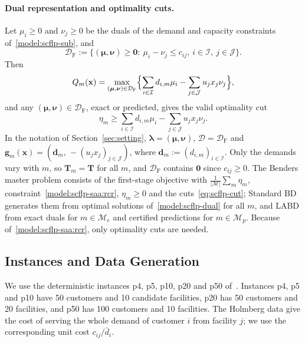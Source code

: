 \paragraph{Dual representation and optimality cuts.} Let $\mu_i\ge0$ and $\nu_j\ge0$ be the duals of the demand and capacity constraints of~\eqref{model:scflp-sub}, and
\[
\mathcal D_{\mathrm F}:=\bigl\{(\boldsymbol\mu,\boldsymbol\nu)\ge\mathbf 0:\ \mu_i-\nu_j\le c_{ij},\ i\in\mathcal I,\ j\in\mathcal J\bigr\}.
\]
Then
\begin{equation}\label{model:scflp-dual}
Q_m(\mathbf x)=\max_{(\boldsymbol\mu,\boldsymbol\nu)\in\mathcal D_{\mathrm F}}\Bigl\{\sum_{i\in\mathcal I}d_{i,m}\mu_i-\sum_{j\in\mathcal J}u_jx_j\nu_j\Bigr\},
\end{equation}
and any $(\boldsymbol\mu,\boldsymbol\nu)\in\mathcal D_{\mathrm F}$, exact or predicted, gives the valid optimality cut
\begin{equation}\label{eq:scflp-cut}
\eta_m\ge\sum_{i\in\mathcal I}d_{i,m}\mu_i-\sum_{j\in\mathcal J}u_jx_j\nu_j .
\end{equation}
In the notation of Section~\ref{sec:setting}, $\boldsymbol\lambda=(\boldsymbol\mu,\boldsymbol\nu)$, $\mathcal D=\mathcal D_{\mathrm F}$ and $\mathbf g_m(\mathbf x)=(\mathbf d_m,\,-(u_jx_j)_{j\in\mathcal J})$, where $\mathbf d_m:=(d_{i,m})_{i\in\mathcal I}$. Only the demands vary with $m$, so $\mathbf T_m=\mathbf T$ for all $m$, and $\mathcal D_{\mathrm F}$ contains $\mathbf 0$ since $c_{ij}\ge0$. The Benders master problem consists of the first-stage objective with $\frac{1}{|\mathcal M|}\sum_m\eta_m$, constraint~\eqref{model:scflp-saa:rcr}, $\eta_m\ge0$ and the cuts~\eqref{eq:scflp-cut}; Standard BD generates them from optimal solutions of~\eqref{model:scflp-dual} for all $m$, and LABD from exact duals for $m\in\mathcal M_e$ and certified predictions for $m\in\mathcal M_p$. Because of~\eqref{model:scflp-saa:rcr}, only optimality cuts are needed.

\subsection{Instances and Data Generation}\label{app:instances}

We use the deterministic instances p4, p5, p10, p20 and p50 of~\cite{holmberg1999exact}. Instances p4, p5 and p10 have 50 customers and 10 candidate facilities, p20 has 50 customers and 20 facilities, and p50 has 100 customers and 10 facilities. The Holmberg data give the cost of serving the whole demand of customer $i$ from facility $j$; we use the corresponding unit cost $c_{ij}/\bar d_i$.

